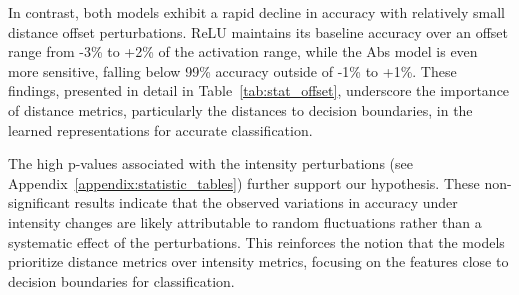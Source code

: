 In contrast, both models exhibit a rapid decline in accuracy with relatively small distance offset perturbations. ReLU maintains its baseline accuracy over an offset range from -3\% to +2\% of the activation range, while the Abs model is even more sensitive, falling below 99\% accuracy outside of -1\% to +1\%. These findings, presented in detail in Table~\ref{tab:stat_offset}, underscore the importance of distance metrics, particularly the distances to decision boundaries, in the learned representations for accurate classification.

The high p-values associated with the intensity perturbations (see Appendix~\ref{appendix:statistic_tables}) further support our hypothesis. These non-significant results indicate that the observed variations in accuracy under intensity changes are likely attributable to random fluctuations rather than a systematic effect of the perturbations. This reinforces the notion that the models prioritize distance metrics over intensity metrics, focusing on the features close to decision boundaries for classification.